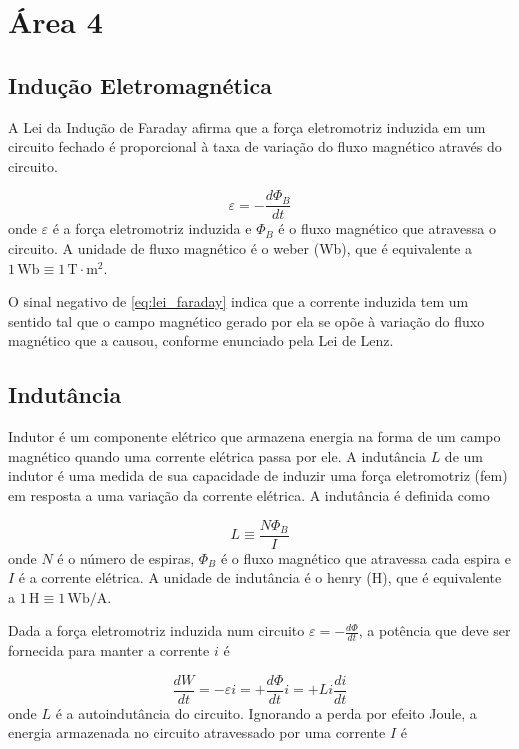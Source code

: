 \documentclass{article}
\begin{document}
\section{Área 4}

\subsection{Indução Eletromagnética}

A Lei da Indução de Faraday afirma que a força eletromotriz induzida em um circuito fechado é proporcional à taxa de variação do fluxo magnético através do circuito.

\begin{equation}\label{eq:lei_faraday}
    \boxed{\varepsilon = -\frac{d\Phi_{B}}{dt}}
\end{equation} onde \(\varepsilon\) é a força eletromotriz induzida e \(\Phi_{B}\) é o fluxo magnético que atravessa o circuito. A unidade de fluxo magnético é o weber (Wb), que é equivalente a \(1 \, \text{Wb} \equiv 1 \, \text{T}\cdot\text{m}^2\).

O sinal negativo de \eqref{eq:lei_faraday} indica que a corrente induzida tem um sentido tal que o campo magnético gerado por ela se opõe à variação do fluxo magnético que a causou, conforme enunciado pela Lei de Lenz.

\subsection{Indutância}

Indutor é um componente elétrico que armazena energia na forma de um campo magnético quando uma corrente elétrica passa por ele. A indutância \(L\) de um indutor é uma medida de sua capacidade de induzir uma força eletromotriz (fem) em resposta a uma variação da corrente elétrica. A indutância é definida como

\begin{equation}
    \boxed{L \equiv \frac{N\Phi_{B}}{I}}
\end{equation} onde \(N\) é o número de espiras, \(\Phi_{B}\) é o fluxo magnético que atravessa cada espira e \(I\) é a corrente elétrica. A unidade de indutância é o henry (H), que é equivalente a \(1 \, \text{H} \equiv 1 \, \text{Wb}/\text{A}\).

Dada a força eletromotriz induzida num circuito \(\displaystyle \varepsilon = - \frac{d\Phi}{dt}\), a potência que deve ser fornecida para manter a corrente \(i\) é

\begin{equation}
    \frac{dW}{dt} = - \varepsilon i = + \frac{d\Phi}{dt} i = + Li \frac{di}{dt}
\end{equation} onde \(L\) é a autoindutância do circuito. Ignorando a perda por efeito Joule, a energia armazenada no circuito atravessado por uma corrente \(I\) é
\end{document}
